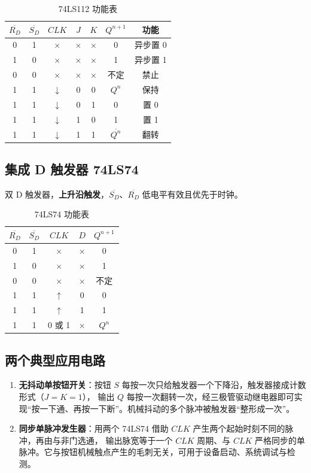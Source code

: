 \begin{table}[!htbp]
\centering
\caption{74LS112 功能表}
\begin{tabular}{ccccc|cc}
\toprule
$\overline{R_D}$ & $\overline{S_D}$ & $CLK$ & $J$ & $K$ & $Q^{n+1}$ & 功能 \\
\midrule
0 & 1 & $\times$ & $\times$ & $\times$ & 0 & 异步置 0 \\
1 & 0 & $\times$ & $\times$ & $\times$ & 1 & 异步置 1 \\
0 & 0 & $\times$ & $\times$ & $\times$ & 不定 & 禁止 \\
1 & 1 & $\downarrow$ & 0 & 0 & $Q^n$ & 保持 \\
1 & 1 & $\downarrow$ & 0 & 1 & 0 & 置 0 \\
1 & 1 & $\downarrow$ & 1 & 0 & 1 & 置 1 \\
1 & 1 & $\downarrow$ & 1 & 1 & $\overline{Q^n}$ & 翻转 \\
\bottomrule
\end{tabular}
\end{table}

\subsection{集成 D 触发器 74LS74}
双 D 触发器，\textbf{上升沿触发}，$\overline{S_D}$、$\overline{R_D}$ 低电平有效且优先于时钟。

\begin{table}[!htbp]
\centering
\caption{74LS74 功能表}
\begin{tabular}{cccc|c}
\toprule
$\overline{R_D}$ & $\overline{S_D}$ & $CLK$ & $D$ & $Q^{n+1}$ \\
\midrule
0 & 1 & $\times$ & $\times$ & 0 \\
1 & 0 & $\times$ & $\times$ & 1 \\
0 & 0 & $\times$ & $\times$ & 不定 \\
1 & 1 & $\uparrow$ & 0 & 0 \\
1 & 1 & $\uparrow$ & 1 & 1 \\
1 & 1 & 0 或 1 & $\times$ & $Q^n$ \\
\bottomrule
\end{tabular}
\end{table}

\subsection{两个典型应用电路}
\begin{enumerate}
    \item \textbf{无抖动单按钮开关}：按钮 $S$ 每按一次只给触发器一个下降沿，触发器接成计数形式（$J=K=1$），
    输出 $Q$ 每按一次翻转一次，经三极管驱动继电器即可实现“按一下通、再按一下断”。机械抖动的多个脉冲被触发器“整形成一次”。
    \item \textbf{同步单脉冲发生器}：用两个 74LS74 借助 $CLK$ 产生两个起始时刻不同的脉冲，再由与非门选通，
    输出脉宽等于一个 $CLK$ 周期、与 $CLK$ 严格同步的单脉冲。它与按钮机械触点产生的毛刺无关，可用于设备启动、系统调试与检测。
\end{enumerate}

